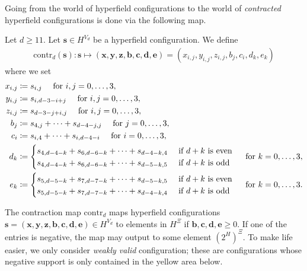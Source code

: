 Going from the world of hyperfield configurations to the world of \emph{contracted} hyperfield configurations is done via the following map.

\begin{definition}
    Let \( d \geq 11 \). Let \( \mathbf{s} \in H^{V_d} \) be a hyperfield configuration. We define 
    \begin{align*}
        \mathrm{contr}_d(\mathbf{s}): \mathbf{s} \mapsto (\mathbf{x}, \mathbf{y}, \mathbf{z}, \mathbf{b}, \mathbf{c}, \mathbf{d}, \mathbf{e}) = (x_{i,j}, y_{i,j}, z_{i,j}, b_j, c_i, d_k, e_k)
    \end{align*}
    where we set
    \begin{align*}
        x_{i,j} &\coloneqq s_{i,j} \quad \text{ for } i,j = 0, \dots, 3, \\
        y_{i,j} &\coloneqq s_{i, d-3-i+j} \quad \text{ for } i,j = 0, \dots, 3, \\
        z_{i,j} &\coloneqq s_{d-3-j+i,j} \quad \text{ for } i,j = 0, \dots, 3, \\
        b_j &\coloneqq s_{4,j} + \dots + s_{d-4-j,j} \quad \text{ for } j = 0, \dots, 3, \\
        c_i &\coloneqq s_{i,4} + \dots + s_{i,d-4-i} \quad \text{ for } i = 0, \dots, 3, \\
        d_k &\coloneqq \begin{cases}
            s_{4,d-4-k} + s_{6,d-6-k} + \dots + s_{d-4-k,4} & \text{ if \( d + k \) is even} \\
            s_{4,d-4-k} + s_{6,d-6-k} + \dots + s_{d-5-k,5} & \text{ if \( d + k \) is odd}
        \end{cases} \quad \text{ for } k = 0, \dots, 3, \\
        e_k &\coloneqq \begin{cases}
            s_{5,d-5-k} + s_{7,d-7-k} + \dots + s_{d-5-k,5} & \text{ if \( d + k \) is even} \\
            s_{5,d-5-k} + s_{7,d-7-k} + \dots + s_{d-4-k,4} & \text{ if \( d + k \) is odd}
        \end{cases} \quad \text{ for } k = 0, \dots, 3.
    \end{align*}
\end{definition}

The contraction map \( \mathrm{contr}_d \) maps hyperfield configurations \( \mathbf{s} = (\mathbf{x}, \mathbf{y}, \mathbf{z}, \mathbf{b}, \mathbf{c}, \mathbf{d}, \mathbf{e}) \in H^{{V_d}} \) to elements in \( H^{\Xi} \) if \( \mathbf{b}, \mathbf{c}, \mathbf{d}, \mathbf{e}  \geq 0\). If one of the entries is negative, the map may output to some element \( (2^H)^{\Xi} \). To make life easier, we only consider \emph{weakly valid} configuration; these are configurations whose negative support is only contained in the yellow area below.

